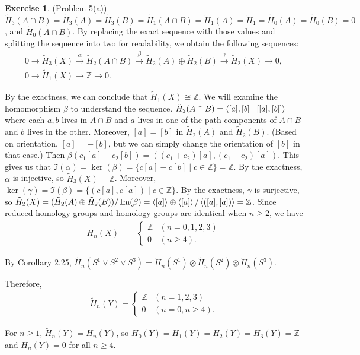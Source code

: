 \documentclass[12pt, psamsfonts]{amsart}
\theoremstyle{definition}
\newtheorem*{exer}{Exercise}
\theoremstyle{remark}
\numberwithin{equation}{section}
\begin{document}
\begin{exer}{(Problem 5(a))}
  $\tilde{H}_3(A \cap B) = \tilde{H}_3(A) = \tilde{H}_3(B) = \tilde{H}_1(A \cap B) = \tilde{H}_1(A) = \tilde{H}_1 = \tilde{H}_0(A) = \tilde{H}_0(B) = 0$, and $\tilde{H}_0(A \cap B)$.
  By replacing the exact sequence with those values and splitting the sequence into two for readability, we obtain the following sequences:
  \begin{gather*}
    0 \rightarrow \tilde{H}_3(X) \xrightarrow{\alpha} \tilde{H}_2(A \cap B) \xrightarrow{\beta} \tilde{H}_2(A) \oplus \tilde{H}_2(B) \xrightarrow{\gamma} \tilde{H}_2(X) \rightarrow 0, \\
    0 \rightarrow \tilde{H}_1(X) \rightarrow \mathbb{Z} \rightarrow 0.
  \end{gather*}

  By the exactness, we can conclude that $\tilde{H}_1(X) \cong \mathbb{Z}$.
  We will examine the homomorphism $\beta$ to understand the sequence.
  $\tilde{H}_2(A \cap B) = \ev{[a], [b] \mid [[a], [b]]}$ where each $a, b$ lives in $A \cap B$ and $a$ lives in one of the path components of $A \cap B$ and $b$ lives in the other.
  Moreover, $[a] = [b]$ in $\tilde{H}_2(A)$ and $\tilde{H}_2(B)$.
  (Based on orientation, $[a] = -[b]$, but we can simply change the orientation of $[b]$ in that case.)
  Then $\beta(c_1[a] + c_2[b]) = ((c_1 + c_2)[a], (c_1 + c_2)[a])$.
  This gives us that $\Im(\alpha) = \ker(\beta) = \{ c[a] - c[b] \mid c \in \mathbb{Z} \} = \mathbb{Z}$.
  By the exactness, $\alpha$ is injective, so $\tilde{H}_3(X) = \mathbb{Z}$.
  Moreover, $\ker(\gamma) = \Im(\beta) = \{ (c[a], c[a]) \mid c \in \mathbb{Z} \}$.
  By the exactness, $\gamma$ is surjective, so $\tilde{H}_2(X) = (\tilde{H}_2(A) \oplus \tilde{H}_2(B)) / \Im(\beta) = \ev{[a]} \oplus \ev{[a]} / \ev{([a], [a])} = \mathbb{Z}$.
  Since reduced homology groups and homology groups are identical when $n \geq 2$, we have
  \begin{align*}
    H_n(X) &= \begin{cases}
      \mathbb{Z} & (n = 0, 1, 2, 3) \\
      0 & (n \geq 4).
    \end{cases}
  \end{align*}


  By Corollary 2.25, $\tilde{H}_n(S^1 \vee S^2 \vee S^3) = \tilde{H}_n(S^1) \otimes \tilde{H}_n(S^2) \otimes \tilde{H}_n(S^3)$.

  Therefore,
  \begin{align*}
    \tilde{H}_n(Y) = \begin{cases}
      \mathbb{Z} & (n = 1, 2, 3) \\
      0 & (n = 0, n \geq 4).
    \end{cases}
  \end{align*}

  For $n \geq 1$, $\tilde{H}_n(Y) = H_n(Y)$, so $H_0(Y) = H_1(Y) = H_2(Y) = H_3(Y) = \mathbb{Z}$ and $H_n(Y) = 0$ for all $n \geq 4$.
\end{exer}
\end{document}
